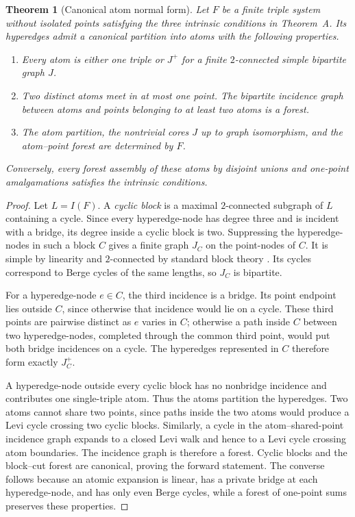 \documentclass[a4paper,11pt,reqno]{amsart}
\theoremstyle{plain}
\newtheorem{theorem}{Theorem}[section]
\theoremstyle{definition}
\theoremstyle{remark}
\begin{document}
\begin{theorem}[Canonical atom normal form]
\label{theorem-canonical-atom-normal-form}
Let $F$ be a finite triple system without isolated points satisfying the three
intrinsic conditions in Theorem~A.  Its hyperedges admit a canonical partition
into \emph{atoms} with the following properties.
\begin{enumerate}
\item Every atom is either one triple or $J^+$ for a finite $2$-connected
simple bipartite graph $J$.
\item Two distinct atoms meet in at most one point.  The bipartite incidence
graph between atoms and points belonging to at least two atoms is a forest.
\item The atom partition, the nontrivial cores $J$ up to graph isomorphism, and
the atom--point forest are determined by $F$.
\end{enumerate}
Conversely, every forest assembly of these atoms by disjoint unions and
one-point amalgamations satisfies the intrinsic conditions.
\end{theorem}
\begin{proof}
Let $L=I(F)$.  A \emph{cyclic block} is a maximal $2$-connected subgraph of
$L$ containing a cycle.  Since every hyperedge-node has degree three and is
incident with a bridge, its degree inside a cyclic block is two.  Suppressing
the hyperedge-nodes in such a block $C$ gives a finite graph $J_C$ on the
point-nodes of $C$.  It is simple by linearity and $2$-connected by standard
block theory \citep{whitney1932,diestel2017}.  Its cycles correspond to Berge cycles of the same lengths, so
$J_C$ is bipartite.

For a hyperedge-node $e\in C$, the third incidence is a bridge.  Its point
endpoint lies outside $C$, since otherwise that incidence would lie on a
cycle.  These third points are pairwise distinct as $e$ varies in $C$;
otherwise a path inside $C$ between two hyperedge-nodes, completed through the
common third point, would put both bridge incidences on a cycle.  The
hyperedges represented in $C$ therefore form exactly $J_C^+$.

A hyperedge-node outside every cyclic block has no nonbridge incidence and
contributes one single-triple atom.  Thus the atoms partition the hyperedges.
Two atoms cannot share two points, since paths inside the two atoms would
produce a Levi cycle crossing two cyclic blocks.  Similarly, a cycle in the
atom--shared-point incidence graph expands to a closed Levi walk and hence to
a Levi cycle crossing atom boundaries.  The incidence graph is therefore a
forest.  Cyclic blocks and the block--cut forest are canonical, proving the
forward statement.  The converse follows because an atomic expansion is
linear, has a private bridge at each hyperedge-node, and has only even Berge
cycles, while a forest of one-point sums preserves these properties.
\end{proof}
\end{document}
